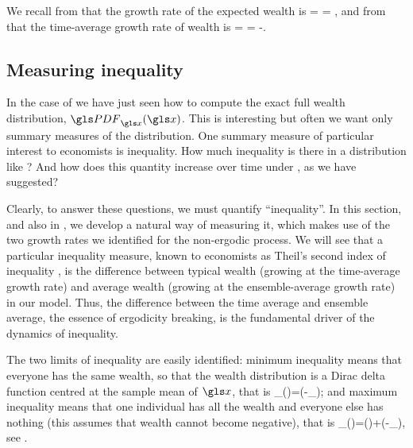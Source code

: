 We recall from  that the growth rate of the expected wealth is
\be
\gex = \frac{\gd\ln\ave{\x}}{\gd\t} = \gmu,
\ee
and from  that the time-average growth rate of wealth is
\be
\gt = \frac{\gd\ave{\ln \x}}{\gd\t} = \gmu-.
\ee


\subsection{Measuring inequality}
In the case of \GBM we have just seen how to 
compute the exact full wealth distribution, $\PDF_\x(\x)$. This is interesting but often we want only summary measures of the distribution. One summary measure of particular interest to economists is inequality. How much inequality is there in a distribution like ? And how does this quantity increase over time under \GBM, as we have suggested?

Clearly, to answer these questions, we must quantify ``inequality''. In this section, and also in \cite{AdamouPeters2016}, we develop a natural way of measuring it, which makes use of the two growth rates we identified for the non-ergodic process. We will see that a particular inequality measure, known to economists as Theil's second index of inequality \cite{Theil1967}, is the difference between typical wealth (growing at the time-average growth rate) and average wealth (growing at the ensemble-average growth rate) in our model. Thus, the difference between the time average and ensemble average, the essence of ergodicity breaking, is the fundamental driver of the dynamics of inequality.

The two limits of inequality are easily identified: minimum inequality means that everyone 
has the same wealth, so that the wealth
distribution is a Dirac delta function centred at the sample mean of $\x$, that is
\be
\PDF_\x(\x)=\delta(\x-\ave{\x}_\N);
\ee
and maximum inequality means that one individual has all the 
wealth and everyone else has nothing (this assumes that wealth cannot become 
negative), that is
\be 
\PDF_\x(\x)=\delta()+\delta(\x-\N\ave{\x}_\N),
\ee
see .

